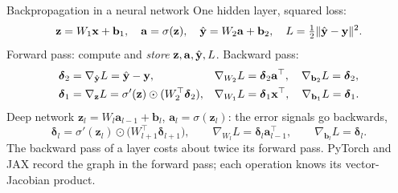 \documentclass[aspectratio=1610,11pt]{beamer}
\begin{document}
\begin{frame}{Backpropagation in a neural network}
    \small
    One hidden layer, squared loss:
    \[\mathbf{z} = W_1\mathbf{x} + \mathbf{b}_1, \quad \mathbf{a} = \sigma(\mathbf{z}), \quad \hat{\mathbf{y}} = W_2\mathbf{a} + \mathbf{b}_2, \quad L = \tfrac{1}{2}\lVert \hat{\mathbf{y}} - \mathbf{y} \rVert^2.\]
    Forward pass: compute and \emph{store} $\mathbf{z}, \mathbf{a}, \hat{\mathbf{y}}, L$. Backward pass:
    \[\begin{aligned}
        \boldsymbol{\delta}_2 &= \nabla_{\hat{\mathbf{y}}}L = \hat{\mathbf{y}} - \mathbf{y}, & \nabla_{W_2}L &= \boldsymbol{\delta}_2\mathbf{a}^\top, \quad \nabla_{\mathbf{b}_2}L = \boldsymbol{\delta}_2, \\
        \boldsymbol{\delta}_1 &= \nabla_{\mathbf{z}}L = \sigma'(\mathbf{z}) \odot (W_2^\top\boldsymbol{\delta}_2), & \nabla_{W_1}L &= \boldsymbol{\delta}_1\mathbf{x}^\top, \quad \nabla_{\mathbf{b}_1}L = \boldsymbol{\delta}_1.
    \end{aligned}\]
    Deep network $\mathbf{z}_l = W_l\mathbf{a}_{l-1} + \mathbf{b}_l$, $\mathbf{a}_l = \sigma(\mathbf{z}_l)$: the error signals go backwards,
    \[\boldsymbol{\delta}_l = \sigma'(\mathbf{z}_l) \odot \big(W_{l+1}^\top\boldsymbol{\delta}_{l+1}\big), \qquad \nabla_{W_l}L = \boldsymbol{\delta}_l\mathbf{a}_{l-1}^\top, \qquad \nabla_{\mathbf{b}_l}L = \boldsymbol{\delta}_l.\]
    The backward pass of a layer costs about twice its forward pass. PyTorch and JAX record the graph in the forward pass; each operation knows its vector-Jacobian product.
\end{frame}

\end{document}
